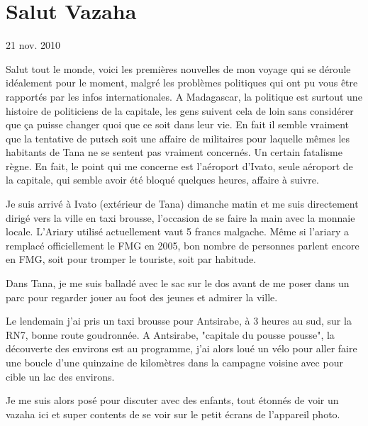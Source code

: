 \section{Salut Vazaha}

21 nov. 2010

\begin{multicols}{2}

Salut tout le monde, voici les premières nouvelles de mon voyage qui se déroule idéalement pour le moment, malgré les problèmes politiques qui ont pu vous être rapportés par les infos internationales. A Madagascar, la politique est surtout une histoire de politiciens de la capitale, les gens suivent cela de loin sans considérer que ça puisse changer quoi que ce soit dans leur vie. En fait il semble vraiment que la tentative de putsch soit une affaire de militaires pour laquelle mêmes les habitants de Tana ne se sentent pas vraiment concernés. Un certain fatalisme règne. En fait, le point qui me concerne est l'aéroport d'Ivato, seule aéroport de la capitale, qui semble avoir été bloqué quelques heures, affaire à suivre.

Je suis arrivé à Ivato (extérieur de Tana) dimanche matin et me suis directement dirigé vers la ville en taxi brousse, l'occasion de se faire la main avec la monnaie locale. L'Ariary utilisé actuellement vaut 5 francs malgache. Même si l'ariary a remplacé officiellement le FMG en 2005, bon nombre de personnes parlent encore en FMG, soit pour tromper le touriste, soit par habitude.

Dans Tana, je me suis balladé avec le sac sur le dos avant de me poser dans un parc pour regarder jouer au foot des jeunes et admirer la ville.


Le lendemain j'ai pris un taxi brousse pour Antsirabe, à 3 heures au sud, sur la RN7, bonne route goudronnée. A Antsirabe, "capitale du pousse pousse", la découverte des environs est au programme, j'ai alors loué un vélo pour aller faire une boucle d'une quinzaine de kilomètres dans la campagne voisine avec pour cible un lac des environs.


Je me suis alors posé pour discuter avec des enfants, tout étonnés de voir un vazaha ici et super contents de se voir sur le petit écrans de l'appareil photo.


\end{multicols}
